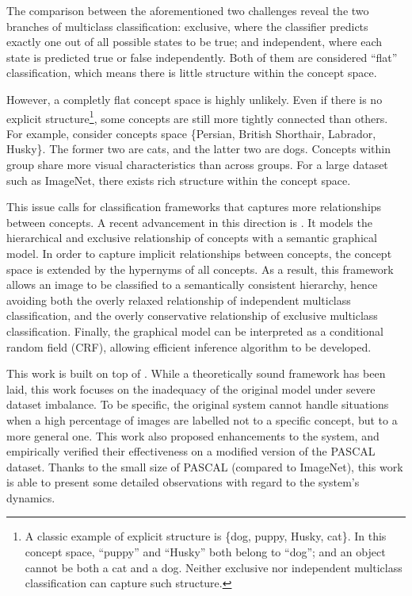\documentclass[11pt,a4paper]{book}
\begin{document}
The comparison between the aforementioned two challenges reveal the two branches of multiclass classification: exclusive, where the classifier predicts exactly one out of all possible states to be true; and independent, where each state is predicted true or false independently. Both of them are considered ``flat'' classification, which means there is little structure within the concept space.

However, a completly flat concept space is highly unlikely. Even if there is no explicit structure\footnote{A classic example of explicit structure is \{dog, puppy, Husky, cat\}. In this concept space, ``puppy'' and ``Husky'' both belong to ``dog''; and an object cannot be both a cat and a dog. Neither exclusive nor independent multiclass classification can capture such structure.}, some concepts are still more tightly connected than others. For example, consider concepts space \{Persian, British Shorthair, Labrador, Husky\}. The former two are cats, and the latter two are dogs. Concepts within group share more visual characteristics than across groups. For a large dataset such as ImageNet, there exists rich structure within the concept space.

This issue calls for classification frameworks that captures more relationships between concepts. A recent advancement in this direction is \cite{deng2014large}. It models the hierarchical and exclusive relationship of concepts with a semantic graphical model. In order to capture implicit relationships between concepts, the concept space is extended by the hypernyms of all concepts. As a result, this framework allows an image to be classified to a semantically consistent hierarchy, hence avoiding both the overly relaxed relationship of independent multiclass classification, and the overly conservative relationship of exclusive multiclass classification. Finally, the graphical model can be interpreted as a conditional random field (CRF), allowing efficient inference algorithm to be developed.

This work is built on top of \cite{deng2014large}. While a theoretically sound framework has been laid, this work focuses on the inadequacy of the original model under severe dataset imbalance. To be specific, the original system cannot handle situations when a high percentage of images are labelled not to a specific concept, but to a more general one. This work also proposed enhancements to the system, and empirically verified their effectiveness on a modified version of the PASCAL dataset. Thanks to the small size of PASCAL (compared to ImageNet), this work is able to present some detailed observations with regard to the system's dynamics.
\end{document}
